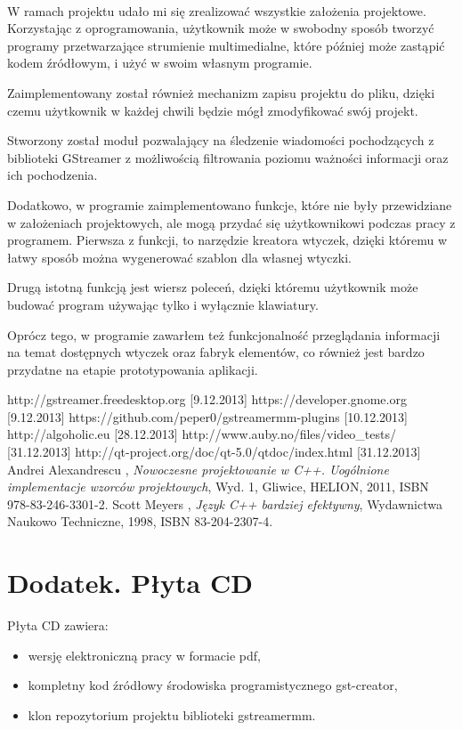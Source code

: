 \documentclass[12pt]{article}
\begin{document}
\paragraph{}W ramach projektu udało mi się zrealizować wszystkie założenia projektowe. Korzystając z oprogramowania, użytkownik może w swobodny sposób tworzyć programy przetwarzające strumienie multimedialne, które później może zastąpić kodem źródłowym, i użyć w swoim własnym programie. 

Zaimplementowany został również mechanizm zapisu projektu do pliku, dzięki czemu użytkownik w każdej chwili będzie mógł zmodyfikować swój projekt. 

Stworzony został moduł pozwalający na śledzenie wiadomości pochodzących z biblioteki GStreamer z możliwością filtrowania poziomu ważności informacji oraz ich pochodzenia.

Dodatkowo, w programie zaimplementowano funkcje, które nie były przewidziane w założeniach projektowych, ale mogą przydać się użytkownikowi podczas pracy z programem. Pierwsza z funkcji, to narzędzie kreatora wtyczek, dzięki któremu w łatwy sposób można wygenerować szablon dla własnej wtyczki. 

Drugą istotną funkcją jest wiersz poleceń, dzięki któremu użytkownik może budować program używając tylko i wyłącznie klawiatury.

Oprócz tego, w programie zawarłem też funkcjonalność przeglądania informacji na temat dostępnych wtyczek oraz fabryk elementów, co również jest bardzo przydatne na etapie prototypowania aplikacji.
\cleardoublepage
{}
\begin{thebibliography}{9}

  http://gstreamer.freedesktop.org [9.12.2013]
  https://developer.gnome.org [9.12.2013]
  https://github.com/peper0/gstreamermm-plugins [10.12.2013]
  http://algoholic.eu [28.12.2013]
  http://www.auby.no/files/video\_tests/ [31.12.2013]
  http://qt-project.org/doc/qt-5.0/qtdoc/index.html [31.12.2013]
  Andrei Alexandrescu , \textit{Nowoczesne projektowanie w C++. Uogólnione implementacje wzorców projektowych}, Wyd. 1, Gliwice, HELION, 2011, ISBN 978-83-246-3301-2.
  Scott Meyers , \textit{Język C++ bardziej efektywny}, Wydawnictwa Naukowo Techniczne, 1998, ISBN 83-204-2307-4.
\end{thebibliography}
\cleardoublepage
\appendix
\section{Dodatek. Płyta CD}
Płyta CD zawiera:
\begin{itemize}
 \setlength{\itemsep}{0em}
\item wersję elektroniczną pracy w formacie pdf,
\item kompletny kod źródłowy środowiska programistycznego gst-creator,
\item klon repozytorium projektu biblioteki gstreamermm.
\end{itemize}
\end{document}
